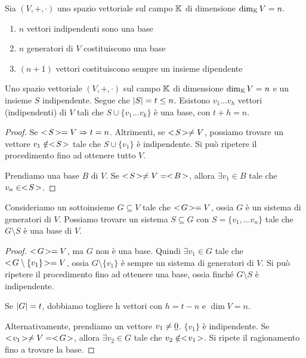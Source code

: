 \begin{oss}
Sia $(V, +, \cdot)$ uno spazio vettoriale sul campo $\mathbb{K}$ di dimensione $\dim_{\mathbb{K}} V = n$.
\begin{enumerate}
    \item $n$ vettori indipendenti sono una base
    \item $n$ generatori di $V$ costituiscono una base
    \item $(n+1)$ vettori costituiscono sempre un insieme dipendente
\end{enumerate}
\end{oss}

\begin{theorem}
Uno spazio vettoriale $(V, +, \cdot)$ sul campo $\mathbb{K}$ di dimensione $\dim_{\mathbb{K}} V = n$ e un insieme $S$ indipendente. Segue che $\left\lvert{S}\right\rvert = t \le n$. Esistono $v_1 \dots v_h$ vettori (indipendenti) di $V$ tali che $S \cup \{ v_1 \dots v_k \}$ \`e una base, con $t + h = n$.
\end{theorem}
\begin{proof}
Se $<\!{S}\!> = V \Rightarrow t = n$. Altrimenti, se $<\!{S}\!> \neq V$, possiamo trovare un vettore $v_1 \notin <\!{S}\!>$ tale che $S \cup \{ v_1 \}$ \`e indipendente. Si pu\`o ripetere il procedimento fino ad ottenere tutto $V$.

Prendiamo una base $B$ di $V$. Se $<\!{S}\!> \neq V = <\!{B}\!>$, allora $\exists v_1 \in B$ tale che $v_n \in <\!{S}\!>$.
\end{proof}

\begin{theorem}
Consideriamo un sottoinsieme $G \subseteq V$ tale che $<\!{G}\!> = V$, ossia $G$ \`e un sistema di generatori di $V$. Possiamo trovare un sistema $S \subseteq G$ con $S = \{ v_1, \dots v_n \}$ tale che $G \setminus S$ \`e una base di $V$.
\end{theorem}
\begin{proof}
$<\!{G}\!> = V$, ma $G$ non \`e una base. Quindi $\exists v_1 \in G$ tale che $<\!{G \setminus \{v_1\}}\!> = V$, ossia $G \setminus \{ v_1 \}$ \`e sempre un sistema di generatori di $V$. Si pu\`o ripetere il procedimento fino ad ottenere una base, ossia finch\'e $G \setminus S$ \`e indipendente.

Se $\left\lvert{G}\right\rvert = t$, dobbiamo togliere h vettori con $h = t - n$ e $\dim V = n$.

Alternativamente, prendiamo un vettore $v_1 \neq \underline{0}$. $\{v_1\}$ \`e indipendente. Se $<\!{v_1}\!> \neq V = <\!{G}\!>$, allora $\exists v_2 \in G$ tale che $v_2 \notin <\!{v_1}\!>$. Si ripete il ragionamento fino a trovare la base.
\end{proof}


